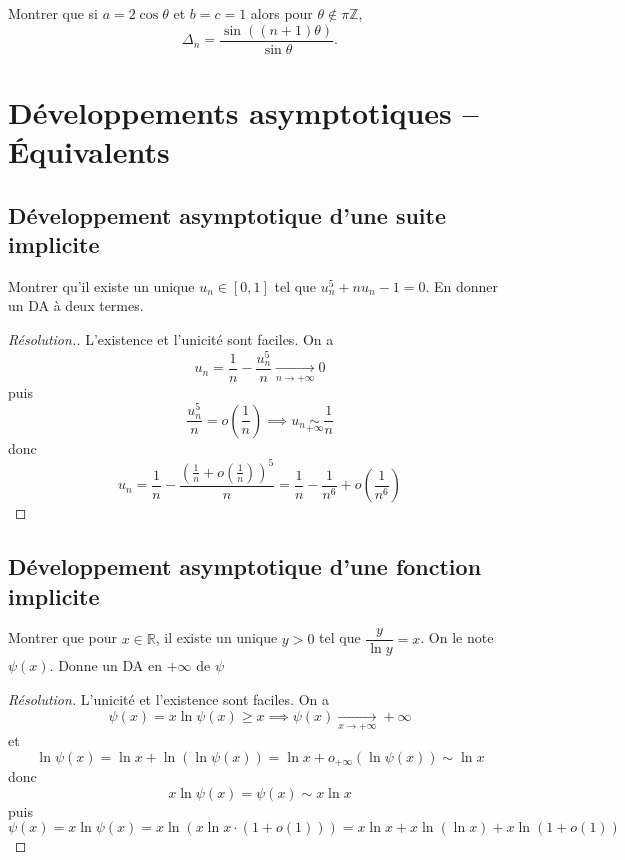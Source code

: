 \begin{exo}
    Montrer que si $a=2\cos\theta$ et $b=c=1$ alors pour $\theta\not\in\pi\mathbb Z$, \[
        \Delta_n=\frac{\sin((n+1)\theta)}{\sin\theta}.
    \]
\end{exo}

\section{Développements asymptotiques -- Équivalents}

\subsection{Développement asymptotique d'une suite implicite}

\begin{exo}
    Montrer qu'il existe un unique $u_n\in[0, 1]$ tel que $u_n^5+nu_n-1=0$. En donner un DA à deux termes.
\end{exo}

\begin{proof}[Résolution.]
    L'existence et l'unicité sont faciles. On a \[
        u_n=\frac1n-\frac{u_n^5}n\xrightarrow[n\to+\infty]{}0
    \]
    puis \[
        \frac{u_n^5}n=o \left( \frac1n \right)\implies u_n\underset{+\infty}\sim\frac1n
    \]
    donc \[
        u_n=\frac1n-\frac{ \left( \frac1n+o\left(\frac1n\right) \right)^5 }n=\frac1n-\frac1{n^6}+o \left( \frac1{n^6} \right)
    \]
\end{proof}

\subsection{Développement asymptotique d'une fonction implicite}

\begin{exo}
    Montrer que pour $x\in\mathbb R$, il existe un unique $y>0$ tel que $\dfrac y{\ln y}=x$. On le note $\psi(x)$. Donne un DA en $+\infty$ de $\psi$
\end{exo}

\begin{proof}[Résolution]
    L'unicité et l'existence sont faciles. On a \[
        \psi(x)=x\ln \psi(x) \geq x \implies \psi(x)\xrightarrow[x\to+\infty]{}+\infty
    \]
    et \[
        \ln\psi(x)=\ln x+\ln(\ln \psi(x))=\ln x+o_{+\infty}(\ln \psi(x))\sim \ln x
    \]
    donc \[
        x\ln \psi(x)=\psi(x)\sim x\ln x
    \]
    puis \[
        \psi(x)=x\ln\psi(x)=x\ln(x\ln x\cdot(1+o(1)))=x\ln x+x\ln(\ln x)+x\ln(1+o(1))
    \]
\end{proof}

